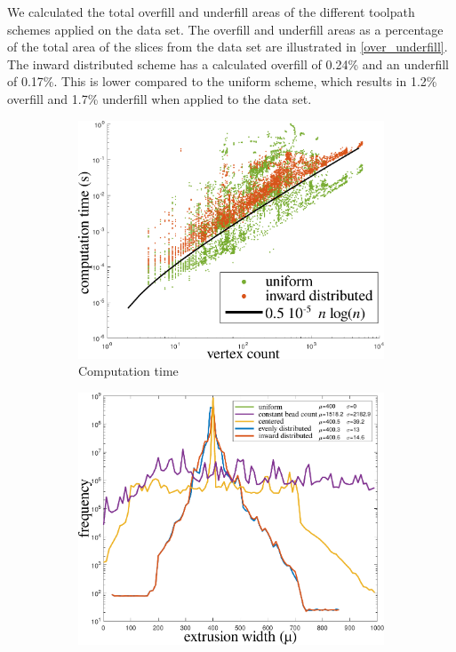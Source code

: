 We calculated the total overfill and underfill areas of the different toolpath schemes applied on the data set. 
The overfill and underfill areas as a percentage of the total area of the slices from the data set are illustrated in \cref{over_underfill}.  
The inward distributed scheme has a calculated overfill of 0.24\% and an underfill of 0.17\%.
This is lower compared to the uniform scheme, which results in 1.2\% overfill and 1.7\% underfill when applied to the data set.

\begin{figure}
\centering
\setlength{\figheight}{0.22\textwidth}
\setlength{\figwidth}{0.31\textwidth}
\begin{subfigure}{\figwidth}\centering
\includegraphics[height=\figheight]{sources/validation/computime2.pdf}
\caption{Computation time}
\label{computime}
\end{subfigure}
\begin{subfigure}{\figwidth}\centering
\includegraphics[height=\figheight]{sources/validation/widthHistogram.pdf}

\end{subfigure}
\end{figure}
